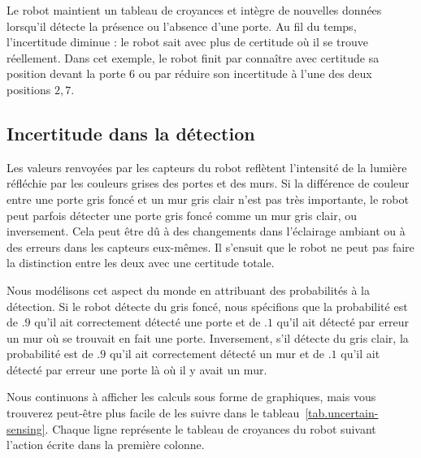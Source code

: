 \begin{center}
\end{center}
Le robot maintient un tableau de croyances et intègre de nouvelles données lorsqu'il détecte la présence ou l'absence d'une porte. Au fil du temps, l'incertitude diminue : le robot sait avec plus de certitude où il se trouve réellement. Dans cet exemple, le robot finit par connaître avec certitude sa position devant la porte $6$ ou par réduire son incertitude à l'une des deux positions $2,7$.

\subsection{Incertitude dans la détection}

Les valeurs renvoyées par les capteurs du robot reflètent l'intensité de la lumière réfléchie par les couleurs grises des portes et des murs. Si la différence de couleur entre une porte gris foncé et un mur gris clair n'est pas très importante, le robot peut parfois détecter une porte gris foncé comme un mur gris clair, ou inversement. Cela peut être dû à des changements dans l'éclairage ambiant ou à des erreurs dans les capteurs eux-mêmes. Il s'ensuit que le robot ne peut pas faire la distinction entre les deux avec une certitude totale.

Nous modélisons cet aspect du monde en attribuant des probabilités à la détection. Si le robot détecte du gris foncé, nous spécifions que la probabilité est de $.9$ qu'il ait correctement détecté une porte et de $.1$ qu'il ait détecté par erreur un mur où se trouvait en fait une porte. Inversement, s'il détecte du gris clair, la probabilité est de $.9$ qu'il ait correctement détecté un mur et de $.1$ qu'il ait détecté par erreur une porte là où il y avait un mur.

Nous continuons à afficher les calculs sous forme de graphiques, mais vous trouverez peut-être plus facile de les suivre dans le tableau~\ref{tab.uncertain-sensing}. Chaque ligne représente le tableau de croyances du robot suivant l'action écrite dans la première colonne.

